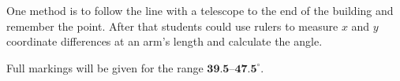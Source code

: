 One method is to follow the line with a telescope to the end of the building
and remember the point. After that students could use rulers to measure $x$
and $y$ coordinate differences at an arm's length and calculate the angle.

Full markings will be given for the range $\textbf{39.5--47.5}^\circ$.
